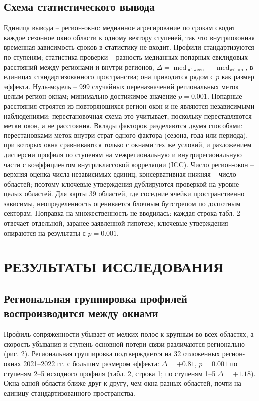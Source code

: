 \documentclass[12pt,a4paper]{article}
\begin{document}
\subsection{Схема статистического вывода}

Единица вывода -- регион-окно: медианное агрегирование по срокам сводит каждое сезонное окно области к одному вектору ступеней, так что внутриоконная временная зависимость сроков в статистику не входит. Профили стандартизуются по ступеням; статистика проверки -- разность медианных попарных евклидовых расстояний между регионами и внутри регионов, $\Delta = \operatorname{med}_{\mathrm{between}} - \operatorname{med}_{\mathrm{within}}$, в единицах стандартизованного пространства; она приводится рядом с $p$ как размер эффекта. Нуль-модель -- 999 случайных переназначений региональных меток целым регион-окнам; минимально достижимое значение $p = 0.001$. Попарные расстояния строятся из повторяющихся регион-окон и не являются независимыми наблюдениями; перестановочная схема это учитывает, поскольку переставляются метки окон, а не расстояния. Вклады факторов разделяются двумя способами: перестановками меток внутри страт одного фактора (сезона, года или периода), при которых окна сравниваются только с окнами тех же условий, и разложением дисперсии профиля по ступеням на межрегиональную и внутрирегиональную части с коэффициентом внутриклассовой корреляции (ICC). Число регион-окон -- верхняя оценка числа независимых единиц, консервативная нижняя -- число областей; поэтому ключевые утверждения дублируются проверкой на уровне целых областей. Для карты 39 областей, где соседние ячейки пространственно зависимы, неопределенность оценивается блочным бутстрепом по долготным секторам. Поправка на множественность не вводилась: каждая строка табл. 2 отвечает отдельной, заранее заявленной гипотезе; ключевые утверждения опираются на результаты с $p = 0.001$.

\section{РЕЗУЛЬТАТЫ ИССЛЕДОВАНИЯ}

\subsection{Региональная группировка профилей воспроизводится между окнами}

Профиль сопряженности убывает от мелких полос к крупным во всех областях, а скорость убывания и ступень основной потери связи различаются регионально (рис. 2). Региональная группировка подтверждается на 32 отложенных регион-окнах 2021--2022 гг. с большим размером эффекта: $\Delta = +0.81$, $p = 0.001$ по ступеням 2--5 исходного профиля (табл. 2, строка 1; по ступеням 1--5 $\Delta = +1.18$). Окна одной области ближе друг к другу, чем окна разных областей, почти на единицу стандартизованного пространства.
\end{document}
